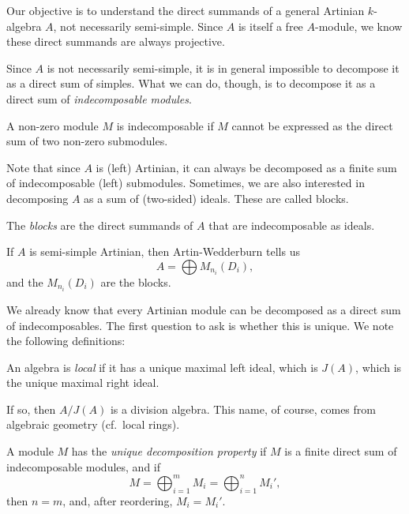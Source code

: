 \documentclass[a4paper]{article}
\begin{document}
Our objective is to understand the direct summands of a general Artinian $k$-algebra $A$, not necessarily semi-simple. Since $A$ is itself a free $A$-module, we know these direct summands are always projective.

Since $A$ is not necessarily semi-simple, it is in general impossible to decompose it as a direct sum of simples. What we can do, though, is to decompose it as a direct sum of \emph{indecomposable modules}.

\begin{defi}[Indecomposable]
  A non-zero module $M$ is indecomposable if $M$ cannot be expressed as the direct sum of two non-zero submodules.
\end{defi}
Note that since $A$ is (left) Artinian, it can always be decomposed as a finite sum of indecomposable (left) submodules. Sometimes, we are also interested in decomposing $A$ as a sum of (two-sided) ideals. These are called blocks.

\begin{defi}[Block]
  The \emph{blocks} are the direct summands of $A$ that are indecomposable as ideals.
\end{defi}

\begin{eg}
  If $A$ is semi-simple Artinian, then Artin-Wedderburn tells us
  \[
    A = \bigoplus M_{n_i}(D_i),
  \]
  and the $M_{n_i}(D_i)$ are the blocks.
\end{eg}

We already know that every Artinian module can be decomposed as a direct sum of indecomposables. The first question to ask is whether this is unique. We note the following definitions:

\begin{defi}
  An algebra is \emph{local} if it has a unique maximal left ideal, which is $J(A)$, which is the unique maximal right ideal.
\end{defi}
If so, then $A/J(A)$ is a division algebra. This name, of course, comes from algebraic geometry (cf.\ local rings).

\begin{defi}
  A module $M$ has the \emph{unique decomposition property} if $M$ is a finite direct sum of indecomposable modules, and if
  \[
    M = \bigoplus_{i = 1}^m M_i = \bigoplus_{i = 1}^n M_i',
  \]
  then $n = m$, and, after reordering, $M_i = M_i'$.
\end{defi}
\end{document}

